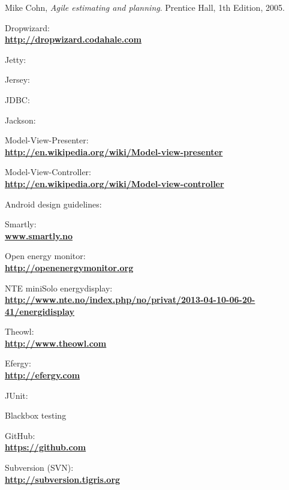 \begin{thebibliography}{1}
  Mike Cohn,
  \emph{Agile estimating and planning}.
  Prentice Hall,
  1th Edition,
  2005.
  
 Dropwizard:\\
\textbf{ \url{http://dropwizard.codahale.com}}

 Jetty:\\
\textbf{ \url{}}

 Jersey:\\
\textbf{ \url{}}

 JDBC:\\
\textbf{ \url{}}

 Jackson:\\
\textbf{ \url{}}

 Model-View-Presenter:\\
\textbf{ \url{http://en.wikipedia.org/wiki/Model-view-presenter}}

 Model-View-Controller:\\
\textbf{ \url{http://en.wikipedia.org/wiki/Model-view-controller}}

 Android design guidelines:\\
\textbf{ \url{}}

        
 Smartly: \\
\textbf{ \url{www.smartly.no}}

 Open energy monitor:\\
\textbf{ \url{http://openenergymonitor.org}}

 NTE miniSolo energydisplay:\\
\textbf{ \url{http://www.nte.no/index.php/no/privat/2013-04-10-06-20-41/energidisplay}}

 Theowl:\\
\textbf{ \url{http://www.theowl.com}}


 Efergy:\\
\textbf{ \url{http://efergy.com}}

 JUnit: \\
\textbf{ \url{}}

 Blackbox testing\\
\textbf{ \url{}}

 GitHub:\\
\textbf{ \url{https://github.com}}

 Subversion (SVN):\\
\textbf{ \url{http://subversion.tigris.org}}


\end{thebibliography}
